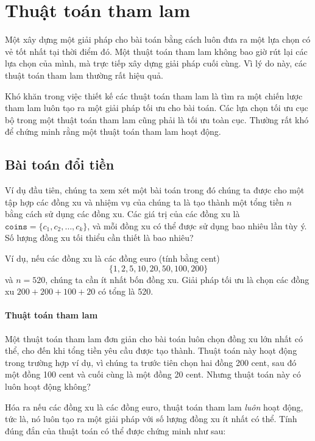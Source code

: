 \chapter{Thuật toán tham lam}


Một 
xây dựng một giải pháp cho bài toán
bằng cách luôn đưa ra một lựa chọn có vẻ
tốt nhất tại thời điểm đó.
Một thuật toán tham lam không bao giờ rút lại
các lựa chọn của mình, mà trực tiếp xây dựng
giải pháp cuối cùng.
Vì lý do này, các thuật toán tham lam
thường rất hiệu quả.

Khó khăn trong việc thiết kế các thuật toán tham lam
là tìm ra một chiến lược tham lam
luôn tạo ra một giải pháp tối ưu
cho bài toán.
Các lựa chọn tối ưu cục bộ trong một thuật toán tham lam
cũng phải là tối ưu toàn cục.
Thường rất khó để chứng minh rằng
một thuật toán tham lam hoạt động.

\section{Bài toán đổi tiền}

Ví dụ đầu tiên, chúng ta xem xét một bài toán
trong đó chúng ta được cho một tập hợp các đồng xu
và nhiệm vụ của chúng ta là tạo thành một tổng tiền $n$
bằng cách sử dụng các đồng xu.
Các giá trị của các đồng xu là
$\texttt{coins}=\{c_1,c_2,\ldots,c_k\}$,
và mỗi đồng xu có thể được sử dụng bao nhiêu lần tùy ý.
Số lượng đồng xu tối thiểu cần thiết là bao nhiêu?

Ví dụ, nếu các đồng xu là các đồng euro (tính bằng cent)
\[\{1,2,5,10,20,50,100,200\}\]
và $n=520$,
chúng ta cần ít nhất bốn đồng xu.
Giải pháp tối ưu là chọn các đồng xu
$200+200+100+20$ có tổng là 520.

\subsubsection{Thuật toán tham lam}

Một thuật toán tham lam đơn giản cho bài toán
luôn chọn đồng xu lớn nhất có thể,
cho đến khi tổng tiền yêu cầu được tạo thành.
Thuật toán này hoạt động trong trường hợp ví dụ,
vì chúng ta trước tiên chọn hai đồng 200 cent,
sau đó một đồng 100 cent và cuối cùng là một đồng 20 cent.
Nhưng thuật toán này có luôn hoạt động không?

Hóa ra nếu các đồng xu là các đồng euro,
thuật toán tham lam \emph{luôn} hoạt động, tức là,
nó luôn tạo ra một giải pháp với số lượng
đồng xu ít nhất có thể.
Tính đúng đắn của thuật toán có thể được
chứng minh như sau:

